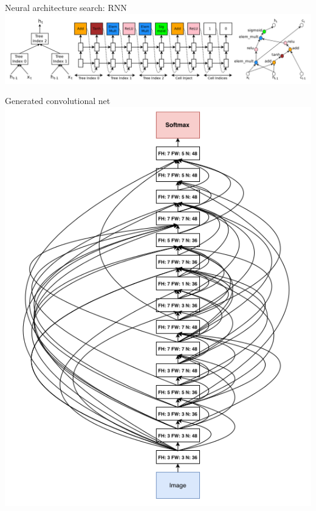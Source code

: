 \documentclass{beamer}
\begin{document}
{%
\begin{frame}{Neural architecture search: RNN}
        \center{}
        \vspace{-1.25cm}
        \hspace*{-1.25cm}
        \includegraphics[scale=0.29]{data/neural_arch_rnn}
\end{frame}
}

{%
\begin{frame}{Generated convolutional net}
        \center{}
        \vspace{-0.25cm}
        \includegraphics[scale=0.33]{data/neural_arch_convnet_output}
\end{frame}
}
\end{document}
